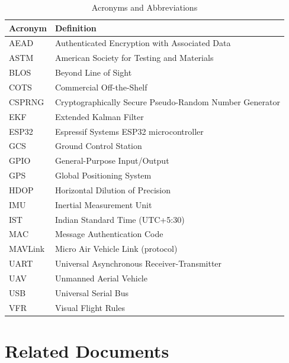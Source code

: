 \documentclass[11pt,a4paper]{article}
\begin{document}
\begin{table}[H]
    \centering
    \begin{tabular}{@{}ll@{}}
        \toprule
        \textbf{Acronym} & \textbf{Definition} \\
        \midrule
        AEAD     & Authenticated Encryption with Associated Data \\
        ASTM     & American Society for Testing and Materials \\
        BLOS     & Beyond Line of Sight \\
        COTS     & Commercial Off-the-Shelf \\
        CSPRNG   & Cryptographically Secure Pseudo-Random Number Generator \\
        EKF      & Extended Kalman Filter \\
        ESP32    & Espressif Systems ESP32 microcontroller \\
        GCS      & Ground Control Station \\
        GPIO     & General-Purpose Input/Output \\
        GPS      & Global Positioning System \\
        HDOP     & Horizontal Dilution of Precision \\
        IMU      & Inertial Measurement Unit \\
        IST      & Indian Standard Time (UTC+5:30) \\
        MAC      & Message Authentication Code \\
        MAVLink  & Micro Air Vehicle Link (protocol) \\
        UART     & Universal Asynchronous Receiver-Transmitter \\
        UAV      & Unmanned Aerial Vehicle \\
        USB      & Universal Serial Bus \\
        VFR      & Visual Flight Rules \\
        \bottomrule
    \end{tabular}
    \caption{Acronyms and Abbreviations}
\end{table}

\section{Related Documents}
\end{document}
